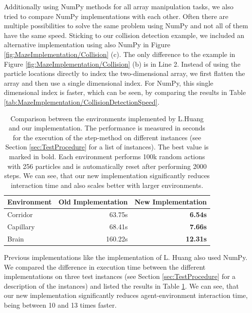 Additionally using NumPy methods for all array manipulation tasks, we also tried to compare NumPy implementations with each other. Often there are multiple possibilities to solve the same problem using NumPy and not all of them have the same speed. Sticking to our collision detection example, we included an alternative implementation using also NumPy in Figure \ref{fig:MazeImplementation/Collision} (c). The only difference to the example in Figure \ref{fig:MazeImplementation/Collision} (b) is in Line 2. Instead of using the particle locations directly to index the two-dimensional array, we first flatten the array and then use a single dimensional index. For NumPy, this single dimensional index is faster, which can be seen, by comparing the results in Table \ref{tab:MazeImplementation/CollisionDetectionSpeed}.

\begin{table}[htp]
    \begin{center}
        \begin{tabular}{lrr}
            \toprule
            \multicolumn{1}{c}{Environment} & \multicolumn{1}{c}{Old Implementation} & \multicolumn{1}{c}{New Implementation} \\
            \midrule
            Corridor & 63.75s & \textbf{6.54s} \\
            Capillary & 68.41s & \textbf{7.66s} \\
            Brain & 160.22s & \textbf{12.31s} \\ 
            \bottomrule
        \end{tabular}
    \end{center}
    \caption[Maze Environment Implementation Speed Comparison]{Comparison between the environments implemented by L.Huang \cite{huangMazeGithub} and our implementation. The performance is measured in seconds for the execution of the step-method on different instances (see Section \ref{sec:TestProcedure} for a list of instances). The best value is marked in bold. Each environment performs 100k random actions with 256 particles and is automatically reset after performing 2000 steps. We can see, that our new implementation significantly reduces interaction time and also scales better with larger environments.} \label{tab:MazeImplementation/ImplementationComparison}
\end{table}

Previous implementations like the implementation of L. Huang \cite{huangMazeGithub} also used NumPy. We compared the difference in execution time between the different implementations on three test instances (see Section \ref{sec:TestProcedure} for a description of the instances) and listed the results in Table \ref{tab:MazeImplementation/ImplementationComparison}. We can see, that our new implementation significantly reduces agent-environment interaction time, being between 10 and 13 times faster.

